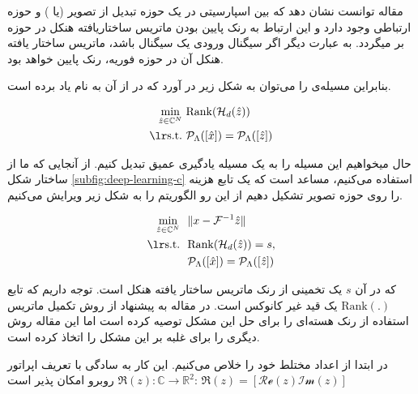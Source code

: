  مقاله \cite{Jin_2016}
توانست نشان دهد که بین اسپارسیتی در یک حوزه تبدیل از تصویر (یا
 )
و حوزه \kspace ارتباطی وجود دارد و این ارتباط به رنک پایین بودن
 ماتریس ساختاریافته هنکل
 در حوزه \kspace بر میگردد. به عبارت دیگر اگر سیگنال ورودی یک سیگنال  باشد، ماتریس ساختار یافته هنکل آن در حوزه فوریه، رنک پایین خواهد بود.

بنابراین مسیله‌ی 
را می‌توان به شکل زیر در آورد که در \cite{Jin_2016} از آن به نام  یاد برده است.



\removevspace
\begin{subequations}
\begin{align}
\min_{\hat{z}\in\mathbb{C}^N} \ &\mathrm{Rank}(\mathcal{H}_d(\hat{z})) \\
\lrtext{s.t.} \ & \Rho_\Lambda([\hat{x}]) = \Rho_\Lambda([\hat{z}])
\end{align}
\end{subequations}


حال میخواهیم این مسيله را به یک مسیله یادگیری عمیق 
تبدیل کنیم. از آنجایی که ما از ساختار شکل \ref{subfig:deep-learning-c}
 استفاده می‌کنیم، مساعد است که یک تابع هزینه را روی حوزه تصویر تشکیل دهیم از این رو الگوریتم  را به شکل زیر ویرایش می‌کنیم.


\begin{subequations}\label{eq:aloha-modify1}
	\begin{align}
	\min_{\hat{z}\in\mathbb{C}^N} \ \  & \| x - \F^{-1}{\hat{z}}\| \\
	\lrtext{s.t.} \ \  & \mathrm{Rank}(\mathcal{H}_d(\hat{z})) = s, \\
	& \Rho_\Lambda([\hat{x}]) = \Rho_\Lambda([\hat{z}])
	\end{align}
\end{subequations}

که در آن $s$ یک تخمینی از رنک ماتریس ساختار یافته هنکل است. توجه داریم که تابع
 $\mathrm{Rank}(.)$
یک قید غیر کانوکس 
است. در مقاله \cite{Jin_2016}
به پیشنهاد از روش تکمیل ماتریس 
\cite{Cand_s_2009}
استفاده از رنک هسته‌ای
را برای حل این مشکل توصیه کرده است اما این مقاله روش دیگری را برای غلبه بر این مشکل را اتخاذ کرده است. 

در ابتدا از اعداد مختلط خود را خلاص می‌کنیم. این کار به سادگی با تعریف اپراتور $\Re(z): \mathbb{C}\rightarrow\mathbb{R}^2$
روبرو امکان پذیر است:
$\Re(z) = [\mathcal{Re}(z) \mathcal{Im}(z)]$

